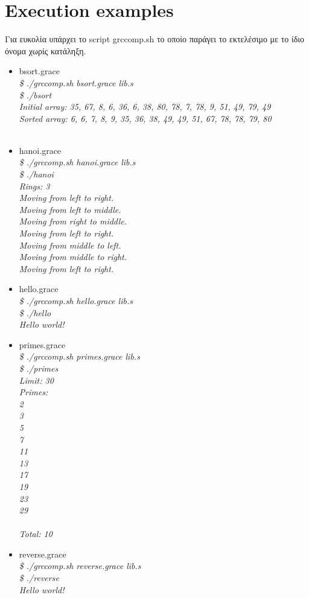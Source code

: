 \documentclass[12pt]{article}
\begin{document}
\section*{Execution examples}
Για ευκολία υπάρχει το script grccomp.sh το οποίο παράγει το εκτελέσιμο με το ίδιο όνομα χωρίς κατάληξη.\\
\begin{itemize}
\item bsort.grace\\
\emph{\$ ./grccomp.sh bsort.grace lib.s\\
\$ ./bsort\\
Initial array: 35, 67, 8, 6, 36, 6, 38, 80, 78, 7, 78, 9, 51, 49, 79, 49\\
Sorted array: 6, 6, 7, 8, 9, 35, 36, 38, 49, 49, 51, 67, 78, 78, 79, 80\\}\\
\item hanoi.grace\\
\emph{\$ ./grccomp.sh hanoi.grace lib.s\\
\$ ./hanoi\\
Rings: 3\\
Moving from left to right.\\
Moving from left to middle.\\
Moving from right to middle.\\
Moving from left to right.\\
Moving from middle to left.\\
Moving from middle to right.\\
Moving from left to right.\\}
\item hello.grace\\
\emph{\$ ./grccomp.sh hello.grace lib.s\\
\$ ./hello\\
Hello world!\\}
\item primes.grace\\
\emph{\$ ./grccomp.sh primes.grace lib.s\\
\$ ./primes\\
Limit: 30\\
Primes:\\
2\\
3\\
5\\
7\\
11\\
13\\
17\\
19\\
23\\
29\\\\
Total: 10\\}
\item reverse.grace\\
\emph{\$ ./grccomp.sh reverse.grace lib.s\\
\$ ./reverse\\
Hello world!}

\end{itemize}
\end{document}
